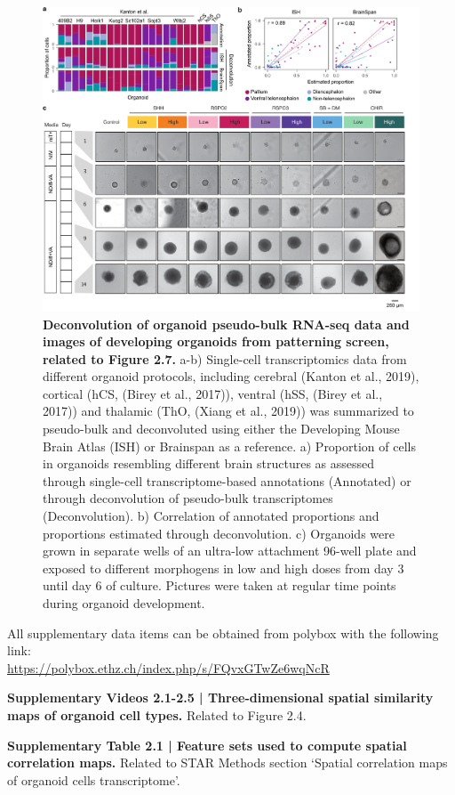 \begin{figure}[h!]
    \centering
	\includegraphics[width=\textwidth]{figures/voxhunt/Supp_7}
    \caption{\textbf{Deconvolution of organoid pseudo-bulk RNA-seq data and images of developing organoids from patterning screen, related to Figure 2.7.} a-b) Single-cell transcriptomics data from different organoid protocols, including cerebral (Kanton et al., 2019), cortical (hCS, (Birey et al., 2017)), ventral (hSS, (Birey et al., 2017)) and thalamic (ThO, (Xiang et al., 2019)) was summarized to pseudo-bulk and deconvoluted using either the Developing Mouse Brain Atlas (ISH) or Brainspan as a reference. a) Proportion of cells in organoids resembling different brain structures as assessed through single-cell transcriptome-based annotations (Annotated) or through deconvolution of pseudo-bulk transcriptomes (Deconvolution). b) Correlation of annotated proportions and proportions estimated through deconvolution. c) Organoids were grown in separate wells of an ultra-low attachment 96-well plate and exposed to different morphogens in low and high doses from day 3 until day 6 of culture. Pictures were taken at regular time points during organoid development.}
    \label{fig:voxS7}
\end{figure}

\clearpage


\noindent
All supplementary data items can be obtained from polybox with the following link: \\ \href{https://polybox.ethz.ch/index.php/s/FQvxGTwZe6wqNcR}{https://polybox.ethz.ch/index.php/s/FQvxGTwZe6wqNcR} 

\vspace{0.5cm}
\noindent
{\normalfont\footnotesize\sffamily\textbf{Supplementary Videos 2.1-2.5 | Three-dimensional spatial similarity maps of organoid cell types.} Related to Figure 2.4.}

\vspace{0.25cm}
\noindent
{\normalfont\footnotesize\sffamily\textbf{Supplementary Table 2.1 | Feature sets used to compute spatial correlation maps.} Related to STAR Methods section ‘Spatial correlation maps of organoid cells transcriptome’.}




